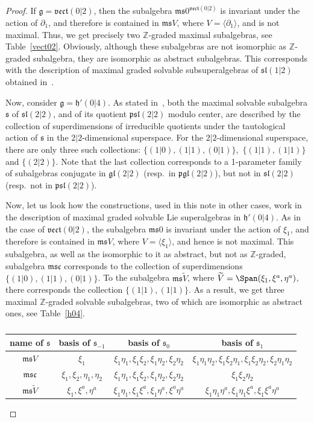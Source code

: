 \documentclass[pdftex]{sigma}
\newcommand {\Zee} {{\mathbb Z}}
\newcommand {\fc} {{\mathfrak{c}}}
\newcommand {\fg} {{\mathfrak{g}}} %
\newcommand {\fgl} {{\mathfrak{gl}}} %
\newcommand {\fh} {{\mathfrak{h}}}
\newcommand {\fm} {{\mathfrak{m}}}
\newcommand {\fp} {{\mathfrak{p}}} %
\newcommand {\fs} {{\mathfrak{s}}}
\newcommand {\fsl} {{\mathfrak{sl}}}
\newcommand {\fvect} {{\mathfrak{vect}}} %
\newcommand {\<} [2] {{\left.\vphantom{#2}\right.^{#1\!}\!{#2}}}
\numberwithin{equation}{section}
\begin{document}
\begin{proof} If $\fg=\fvect(0|2)$, then the subalgebra $\fm\fs 0^{\fvect(0|2)}$ is invariant under the action of $\partial_1$, and therefore is contained in $\fm\fs V$, where $V=\langle \partial_1\rangle$, and is not maximal. Thus, we get precisely two $\Zee$-graded maximal subalgebras, see Table~\ref{vect02}. Obviously, although these subalgebras are not isomorphic as $\Zee$-graded subalgebra, they are isomorphic as abstract subalgebras. This corresponds with the description of maximal graded solvable subsuperalgebras of $\fsl(1|2)$ obtained in~\cite{S2}.

Now, consider $\fg=\fh'(0|4)$. As stated in~\cite{S2}, both the maximal solvable subalgebra $\fs$ of $\fsl(2|2)$, and of its quotient $\fp\fsl(2|2)$ modulo center, are described by the collection of superdimensions of irreducible quotients under the tautological action of $\fs$ in the $2|2$-dimensional superspace. For the $2|2$-dimensional superspace, there are only three such collections: $\{(1|0), (1|1), (0|1)\}$,\, $\{(1|1), (1|1)\}$ and $\{(2|2)\}$. Note that the last collection corresponds to a 1-parameter family of subalgebras conjugate in $\fgl(2|2)$ (resp.\ in $\fp\fgl(2|2)$), but not in $\fsl(2|2)$ (resp.\ not in $\fp\fsl(2|2)$).

Now, let us look how the constructions, used in this note in other cases, work in the description of maximal graded solvable Lie superalgebras in $\fh'(0|4)$. As in the case of $\fvect(0|2)$, the subalgebra $\fm\fs 0$ is invariant under the action of $\xi_1$, and therefore is contained in $\fm\fs V$, where $V=\langle \xi_1\rangle$, and hence is not maximal. This subalgebra, as well as the isomorphic to it as abstract, but not as $\Zee$-graded, subalgebra $\fm\fs\fc$ corresponds to the collection of superdimensions $\{(1|0), (1|1), (0|1)\}$. To the subalgebra $\fm\fs\widetilde V$, where $\widetilde V=\Span(\xi_1,\xi^a,\eta^a)$, there corresponds the collection $\{(1|1), (1|1)\}$. As a result, we get three maximal $\Zee$-graded solvable subalgebras, two of which are isomorphic as abstract ones, see Table~\ref{h04}.
\begin{table}[h]\centering\renewcommand{\arraystretch}{1.2}
\begin{tabular}{|c|c|c|c|}
\hline
name of $\fs$ & basis of $\fs_{-1}$ & basis of $\fs_0$ & basis of $\fs_1$\\
\hline
$\fm\fs V$ & $\xi_1 $ & $\xi_1\eta_1, \xi_1\xi_2, \xi_1\eta_2, \xi_2\eta_2$ & $\xi_1\eta_1\eta_2, \xi_1\xi_2\eta_1, \xi_1\xi_2\eta_2, \xi_2\eta_1\eta_2$ \\
\hline
$\fm\fs\fc$ & $\xi_1, \xi_2,\eta_1,\eta_2 $ & $\xi_1\eta_1, \xi_1\xi_2, \xi_1\eta_2, \xi_2\eta_2$ & $\xi_1\xi_2\eta_2$ \\
\hline
$\fm\fs\widetilde V$ & $\xi_1, \xi^a, \eta^a$ & $\xi_1\eta_1, \xi_1\xi^a, \xi_1\eta^a, \xi^a\eta^a$ & $\xi_1\eta_1\eta^a, \xi_1\eta_1\xi^a, \xi_1\xi^a\eta^a$ \\
\hline
\end{tabular}
\caption{}\label{ill}
\end{table}


\end{proof}
\end{document}
